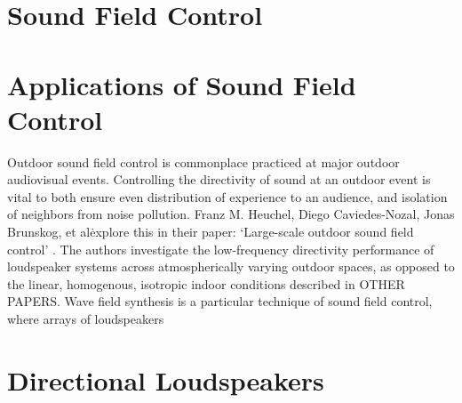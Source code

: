 \documentclass{report}
\begin{document}
    \section{Sound Field Control}
        

    \section{Applications of Sound Field Control}

        Outdoor sound field control is commonplace practiced at major outdoor audiovisual events.
        Controlling the directivity of sound at an outdoor event is vital to both ensure even distribution of experience to an audience, and isolation of neighbors from noise pollution.
        Franz M. Heuchel, Diego Caviedes-Nozal, Jonas Brunskog, et al\. explore this in their paper: `Large-scale outdoor sound field control' \cite{heuchel2020large}.
        The authors investigate the low-frequency directivity performance of loudspeaker systems across atmospherically varying outdoor spaces, as opposed to the linear, homogenous, isotropic indoor conditions described in OTHER PAPERS.
        Wave field synthesis is a particular technique of sound field control, where arrays of loudspeakers 

    \section{Directional Loudspeakers}
\end{document}
